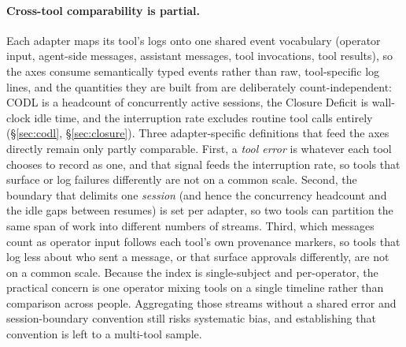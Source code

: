\documentclass[10pt,twocolumn]{article}
\begin{document}
\paragraph{Cross-tool comparability is partial.} Each adapter maps its tool's
logs onto one shared event vocabulary (operator input, agent-side messages,
assistant messages, tool invocations, tool results), so the axes consume semantically typed events rather
than raw, tool-specific log lines, and the quantities they are built from are
deliberately count-independent: CODL is a headcount of concurrently active
sessions, the Closure Deficit is wall-clock idle time, and the interruption rate
excludes routine tool calls entirely (\S\ref{sec:codl}, \S\ref{sec:closure}).
Three adapter-specific definitions that feed the axes directly remain only partly
comparable. First, a \emph{tool error} is whatever each tool chooses to record
as one, and that signal feeds the interruption rate, so tools that surface or
log failures differently are not on a common scale. Second, the boundary that
delimits one \emph{session} (and hence the concurrency headcount and the idle
gaps between resumes) is set per adapter, so two tools can partition the same
span of work into different numbers of streams. Third, which messages count as
operator input follows each tool's own provenance markers, so tools that log
less about who sent a message, or that surface approvals differently, are not on
a common scale. Because the index is
single-subject and per-operator, the practical concern is one operator mixing
tools on a single timeline rather than comparison across people. Aggregating those
streams without a shared error and session-boundary convention still risks
systematic bias, and establishing that convention is left to a multi-tool
sample.
\end{document}
